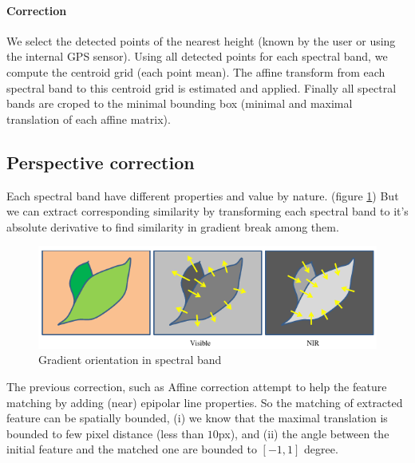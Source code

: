 \documentclass[]{elsarticle}
\begin{document}
	\paragraph{Correction} We select the detected points of the nearest height (known by the user or using the internal GPS sensor).
	Using all detected points for each spectral band, we compute the centroid grid (each point mean).
	The affine transform from each spectral band to this centroid grid is estimated and applied.
	Finally all spectral bands are croped to the minimal bounding box (minimal and maximal translation of each affine matrix).
	
	\subsection{Perspective correction}
	
	Each spectral band have different properties and value by nature. (figure \ref{fig:vegetable-gradient})
	But we can extract corresponding similarity by transforming each spectral band to it's absolute derivative
	to find similarity in gradient break among them.
	
	\begin{figure}[!htb]
		\centering
		\includegraphics[width=\linewidth]{../figures/contrast-inversion.png}
		\caption{Gradient orientation in spectral band \cite{rabatel:hal-01684135}}
		\label{fig:vegetable-gradient}
	\end{figure}
	
	\par The previous correction, such as Affine correction attempt to help the feature matching by adding (near) epipolar line properties.
	So the matching of extracted feature can be spatially bounded,
	(i) we know that the maximal translation is bounded to few pixel distance (less than $10$px),
	and (ii) the angle between the initial feature and the matched one are bounded to $[-1,1]$ degree.
	
\end{document}

